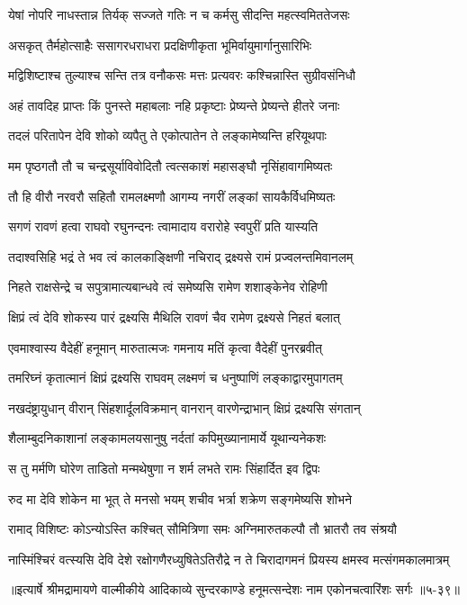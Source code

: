 \twolineshloka
{येषां नोपरि नाधस्तान्न तिर्यक् सज्जते गतिः}
{न च कर्मसु सीदन्ति महत्स्वमिततेजसः} %

\twolineshloka
{असकृत् तैर्महोत्साहैः ससागरधराधरा}
{प्रदक्षिणीकृता भूमिर्वायुमार्गानुसारिभिः} %

\twolineshloka
{मद्विशिष्टाश्च तुल्याश्च सन्ति तत्र वनौकसः}
{मत्तः प्रत्यवरः कश्चिन्नास्ति सुग्रीवसंनिधौ} %

\twolineshloka
{अहं तावदिह प्राप्तः किं पुनस्ते महाबलाः}
{नहि प्रकृष्टाः प्रेष्यन्ते प्रेष्यन्ते हीतरे जनाः} %

\twolineshloka
{तदलं परितापेन देवि शोको व्यपैतु ते}
{एकोत्पातेन ते लङ्कामेष्यन्ति हरियूथपाः} %

\twolineshloka
{मम पृष्ठगतौ तौ च चन्द्रसूर्याविवोदितौ}
{त्वत्सकाशं महासङ्घौ नृसिंहावागमिष्यतः} %

\twolineshloka
{तौ हि वीरौ नरवरौ सहितौ रामलक्ष्मणौ}
{आगम्य नगरीं लङ्कां सायकैर्विधमिष्यतः} %

\twolineshloka
{सगणं रावणं हत्वा राघवो रघुनन्दनः}
{त्वामादाय वरारोहे स्वपुरीं प्रति यास्यति} %

\twolineshloka
{तदाश्वसिहि भद्रं ते भव त्वं कालकाङ्क्षिणी}
{नचिराद् द्रक्ष्यसे रामं प्रज्वलन्तमिवानलम्} %

\twolineshloka
{निहते राक्षसेन्द्रे च सपुत्रामात्यबान्धवे}
{त्वं समेष्यसि रामेण शशाङ्केनेव रोहिणी} %

\twolineshloka
{क्षिप्रं त्वं देवि शोकस्य पारं द्रक्ष्यसि मैथिलि}
{रावणं चैव रामेण द्रक्ष्यसे निहतं बलात्} %

\twolineshloka
{एवमाश्वास्य वैदेहीं हनूमान् मारुतात्मजः}
{गमनाय मतिं कृत्वा वैदेहीं पुनरब्रवीत्} %

\twolineshloka
{तमरिघ्नं कृतात्मानं क्षिप्रं द्रक्ष्यसि राघवम्}
{लक्ष्मणं च धनुष्पाणिं लङ्काद्वारमुपागतम्} %

\twolineshloka
{नखदंष्ट्रायुधान् वीरान् सिंहशार्दूलविक्रमान्}
{वानरान् वारणेन्द्राभान् क्षिप्रं द्रक्ष्यसि संगतान्} %

\twolineshloka
{शैलाम्बुदनिकाशानां लङ्कामलयसानुषु}
{नर्दतां कपिमुख्यानामार्ये यूथान्यनेकशः} %

\twolineshloka
{स तु मर्मणि घोरेण ताडितो मन्मथेषुणा}
{न शर्म लभते रामः सिंहार्दित इव द्विपः} %

\twolineshloka
{रुद मा देवि शोकेन मा भूत् ते मनसो भयम्}
{शचीव भर्त्रा शक्रेण सङ्गमेष्यसि शोभने} %

\twolineshloka
{रामाद् विशिष्टः कोऽन्योऽस्ति कश्चित् सौमित्रिणा समः}
{अग्निमारुतकल्पौ तौ भ्रातरौ तव संश्रयौ} %

\twolineshloka
{नास्मिंश्चिरं वत्स्यसि देवि देशे रक्षोगणैरध्युषितेऽतिरौद्रे}
{न ते चिरादागमनं प्रियस्य क्षमस्व मत्संगमकालमात्रम्} %


॥इत्यार्षे श्रीमद्रामायणे वाल्मीकीये आदिकाव्ये सुन्दरकाण्डे हनूमत्सन्देशः नाम एकोनचत्वारिंशः सर्गः ॥५-३९॥

